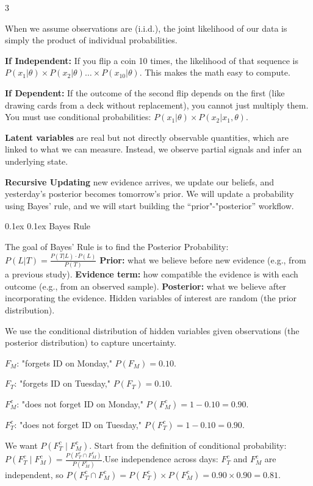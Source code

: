 \documentclass[8pt,landscape]{article}
\makeatletter
\renewcommand{\subsection}{\@startsection{subsection}{2}{0pt}%
    {0.1ex}%
    {0.1ex}%
    {\fontsize{8}{9}\bfseries\color{blue}}} %
\newcommand{\smalltext}[1]{
  {\fontsize{8}{9}\selectfont\sloppy #1\par}
}
\makeatother
\begin{document}
\begin{multicols}{3}
{  When we assume observations are (i.i.d.), the joint likelihood of our data is simply the product of individual probabilities.
  
  \textbf{If Independent:} If you flip a coin 10 times, the likelihood of that sequence is $P(x_1|\theta) \times P(x_2|\theta) \dots \times P(x_{10}|\theta)$. 
  This makes the math easy to compute.
  
  \textbf{If Dependent:} If the outcome of the second flip depends on the first (like drawing cards from a deck without replacement), you cannot just multiply them. You must use conditional probabilities: $P(x_1|\theta) \times P(x_2|x_1, \theta)$.
  
  \textbf{Latent variables } are real but not directly observable quantities, which are linked to what we can measure.
  Instead, we observe partial signals and infer an underlying state.

  \textbf{Recursive Updating} new evidence arrives, we update our beliefs, and yesterday's posterior becomes tomorrow's prior.
  We will update a probability using Bayes' rule, and we will start building the “prior"-"posterior” workflow.

 }
 \subsection{Bayes Rule}
\smalltext{
  The goal of Bayes' Rule is to find the Posterior Probability:
  $P(L | T) = \frac{P(T | L) \cdot P(L)}{P(T)}$ \textbf{Prior:} what we believe before new evidence (e.g., from a previous study).
  \textbf{Evidence term:} how compatible the evidence is with each outcome (e.g., from an observed sample).
  \textbf{Posterior:} what we believe after incorporating the evidence.
  Hidden variables of interest are random (the prior distribution).

  We use the conditional distribution of hidden variables given observations (the posterior distribution) to capture uncertainty.

  $F_M$: "forgets ID on Monday," $P(F_M) = 0.10$.
  
  $F_T$: "forgets ID on Tuesday," $P(F_T) = 0.10$.
  
  $F_M^c$: "does not forget ID on Monday," $P(F_M^c) = 1 - 0.10 = 0.90$.
  
  $F_T^c$: "does not forget ID on Tuesday," $P(F_T^c) = 1 - 0.10 = 0.90$.
  
  We want $P(F_T^c \mid F_M^c)$. Start from the definition of conditional probability:$P(F_T^c \mid F_M^c) = \frac{P(F_T^c \cap F_M^c)}{P(F_M^c)}.$Use independence across days: $F_T^c$ and $F_M^c$ are independent, so $P(F_T^c \cap F_M^c) = P(F_T^c) \times P(F_M^c) = 0.90 \times 0.90 = 0.81.$
  
}
\end{multicols}
\end{document}
